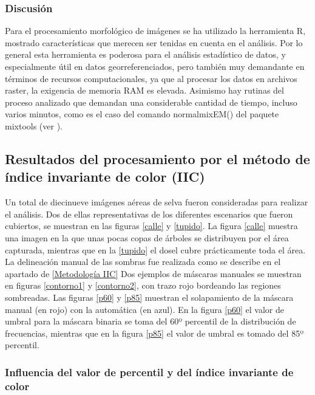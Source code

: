 \subsubsection{Discusión}
Para el procesamiento morfológico de imágenes se ha utilizado la herramienta R, mostrado características que merecen ser tenidas en cuenta en el análisis. Por lo general esta herramienta es poderosa para el análisis estadístico de datos, y especialmente útil en datos georreferenciados, pero también muy demandante en términos de recursos computacionales, ya que al procesar los datos en archivos raster, la exigencia de memoria RAM es elevada. Asimismo hay rutinas del proceso analizado que demandan una considerable cantidad de tiempo, incluso varios minutos, como es el caso del comando  normalmixEM() del paquete mixtools (ver \cite{young__aut_mixtools_2022}).


\subsection{Resultados del procesamiento por el método de índice invariante de color (IIC)} \label{Resultados IIC}
Un total de diecinueve imágenes aéreas de selva fueron consideradas para realizar el análisis. Dos de ellas representativas de los diferentes escenarios que fueron cubiertos, se muestran en las figuras \ref{calle} y \ref{tupido}. La figura \ref{calle} muestra una imagen en la que unas pocas copas de árboles se distribuyen por el área capturada, mientras que en la \ref{tupido} el dosel cubre prácticamente toda el área. La delineación manual de las sombras fue realizada como se describe en el apartado de \ref{Metodología IIC}
Dos ejemplos de máscaras manuales se muestran en figuras \ref{contorno1} y \ref{contorno2}, con trazo rojo bordeando las regiones sombreadas. Las figuras \ref{p60} y \ref{p85} muestran el solapamiento de la máscara manual (en rojo) con la automática (en azul). En la figura \ref{p60} el valor de umbral para la máscara binaria se toma del 60º percentil de la distribución de frecuencias, mientras que en la figura \ref{p85} el valor de umbral es tomado del 85º percentil.



\subsubsection{Influencia del valor de percentil y del índice invariante de color}

